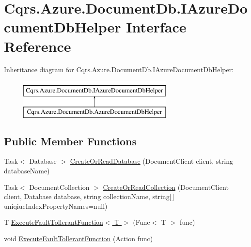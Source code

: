 \hypertarget{interfaceCqrs_1_1Azure_1_1DocumentDb_1_1IAzureDocumentDbHelper}{}\section{Cqrs.\+Azure.\+Document\+Db.\+I\+Azure\+Document\+Db\+Helper Interface Reference}
\label{interfaceCqrs_1_1Azure_1_1DocumentDb_1_1IAzureDocumentDbHelper}
Inheritance diagram for Cqrs.\+Azure.\+Document\+Db.\+I\+Azure\+Document\+Db\+Helper\+:\begin{figure}[H]
\begin{center}
\leavevmode
\includegraphics[height=2.000000cm]{interfaceCqrs_1_1Azure_1_1DocumentDb_1_1IAzureDocumentDbHelper}
\end{center}
\end{figure}
\subsection*{Public Member Functions}
\begin{DoxyCompactItemize}
\item 
Task$<$ Database $>$ \hyperlink{interfaceCqrs_1_1Azure_1_1DocumentDb_1_1IAzureDocumentDbHelper_a07fd454bc3cb598d89d058e0ad0d9bb9}{Create\+Or\+Read\+Database} (Document\+Client client, string database\+Name)
\item 
Task$<$ Document\+Collection $>$ \hyperlink{interfaceCqrs_1_1Azure_1_1DocumentDb_1_1IAzureDocumentDbHelper_a9f0e2c54e9a9056351827bdcfd298feb}{Create\+Or\+Read\+Collection} (Document\+Client client, Database database, string collection\+Name, string\mbox{[}$\,$\mbox{]} uniqiue\+Index\+Property\+Names=null)
\item 
T \hyperlink{interfaceCqrs_1_1Azure_1_1DocumentDb_1_1IAzureDocumentDbHelper_a9693547c39af965e6eeeccc65cdd7bea}{Execute\+Fault\+Tollerant\+Function$<$ T $>$} (Func$<$ T $>$ func)
\item 
void \hyperlink{interfaceCqrs_1_1Azure_1_1DocumentDb_1_1IAzureDocumentDbHelper_af0a2c96f00154420faa7c528d5bf55bb}{Execute\+Fault\+Tollerant\+Function} (Action func)
\end{DoxyCompactItemize}



